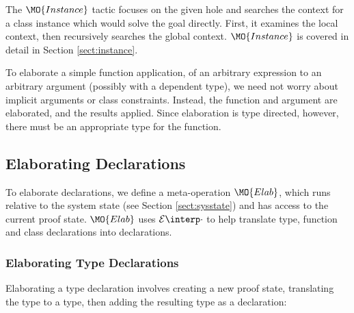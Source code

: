 The $\MO{Instance}$ tactic focuses on the given hole and searches the context for
a class instance which would solve the goal directly. First, it examines the local
context, then recursively searches the global context. $\MO{Instance}$ is covered
in detail in Section \ref{sect:instance}.

To elaborate a simple function application, of an arbitrary expression to an
arbitrary argument (possibly with a dependent type), we need not worry about
implicit arguments or class constraints. Instead, the function and argument are
elaborated, and the results applied. Since elaboration is type directed,
however, there must be an appropriate type for the function. 




\subsection{Elaborating Declarations}

To elaborate declarations, we define a meta-operation $\MO{Elab}$, which runs
relative to the system state (see Section \ref{sect:sysstate}) and has access to the
current proof state. $\MO{Elab}$ uses $\ttinterp{\cdot}$ to help translate
\IdrisM{} type, function and class declarations into \TT{} declarations.

\newcommand{\edo}[1]{\RW{do}\;\AR{#1}}

\subsubsection{Elaborating Type Declarations}

Elaborating a type declaration involves creating a new proof state,
translating the \IdrisM{} type to a \TT{} type, then adding the resulting type
as a \TT{} declaration:

